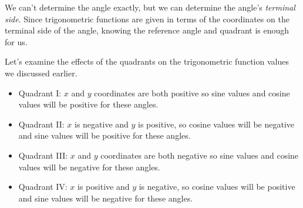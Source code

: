 \documentclass[nooutcomes]{ximera}
\begin{document}
\begin{image}
\end{image}

We can't determine the angle exactly, but we can determine the angle's \emph{terminal side}. Since trigonometric functions are given in terms of the coordinates on the
terminal side of the angle, knowing the reference angle and quadrant is enough for us.

Let's examine the effects of the quadrants on the trigonometric function values we discussed earlier.
\begin{itemize}
	\item Quadrant I: $x$ and $y$ coordinates are both positive so sine values and cosine values will be positive for these angles.
	\item Quadrant II: $x$ is negative and $y$ is positive, so cosine values will be negative and sine values will be positive for these angles.
	\item Quadrant III: $x$ and $y$ coordinates are both negative so sine values and cosine values will be negative for these angles.
	\item Quadrant IV: $x$ is positive and $y$ is negative, so cosine values will be positive and sine values will be negative for these angles.
\end{itemize}
\end{document}
